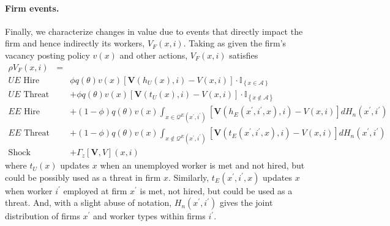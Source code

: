 \paragraph{Firm events.}
Finally, we characterize changes in value due to events that directly impact the firm and hence
indirectly its workers, $V_F(x,i)$.
Taking as given the firm's vacancy posting policy $v(x)$ and
other actions, $V_F(x,i)$ satisfies
\begin{eqnarray*}
\rho V_{F}\left( x,i\right) &=& \\
\text{$UE$ Hire} &&\phi q(\theta)v\left( x\right) \left[ \bm{V}\left(
h_{U}\left( x\right) ,i\right) -V\left( x,i\right) \right] \cdot \mathbb{I}%
_{\left\{ x\in \mathcal{A}\right\} } \\
\text{$UE$ Threat} &&+\phi q(\theta)v\left( x\right) \left[ \bm{V}\left(
t_{U}\left( x\right) ,i\right) -V\left( x,i\right) \right] \cdot \mathbb{I}%
_{\left\{ x\notin \mathcal{A}\right\} } \\
\text{$EE$ Hire} &&+\left( 1-\phi \right)q(\theta)v\left( x\right)
\int_{x\in \mathcal{Q}^{E}\left( x^{\prime },i^{\prime }\right) }\left[
\bm{V}\left( h_{E}\left( x^{\prime },i^{\prime },x\right) ,i\right)
-V\left( x,i\right) \right] dH_n\left( x^{\prime },i^{\prime }\right) \\
\text{$EE$ Threat} &&+\left( 1-\phi \right)q(\theta)v\left( x\right)
\int_{x\notin \mathcal{Q}^{E}\left( x^{\prime},i^{\prime}\right) }\left[
\bm{V}\left( t_{E}\left( x^{\prime },i^{\prime },x\right) ,i\right)
-V\left( x,i\right) \right] dH_n\left( x^{\prime },i^{\prime }\right) \\
\text{Shock} &&+\Gamma _{z}\left[ \bm{V},V\right] \left( x,i\right)
\end{eqnarray*}%
where $t_{U}\left( x\right) $ updates $x$ when an
unemployed worker is met and not hired, but could be possibly used as a
threat in firm $x$. Similarly, $t_{E}(x^{\prime },i^{\prime },x)$ updates
$x$ when worker $i^{\prime }$ employed at firm $x^{\prime }$
is met, not hired, but could be used as a threat. And, with a slight abuse
of notation, $H_n(x^\prime,i^\prime)$ gives the joint distribution of firms $%
x^\prime$ and worker types within firms $i^\prime$.

